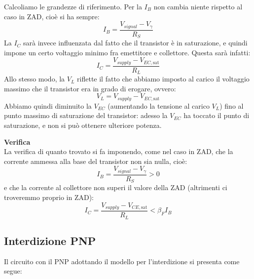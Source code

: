 \documentclass[a4paper,11pt]{article}
\begin{document}
Calcoliamo le grandezze di riferimento. Per la $I_B$ non cambia niente rispetto al caso in ZAD, cioè si ha sempre:
$$
I_B = \frac{V_{signal} - V_\gamma}{R_S}
$$
La $I_C$ sarà invece influenzata dal fatto che il transistor è in saturazione, e quindi impone un certo voltaggio minimo fra emettitore e collettore. Questa sarà infatti:
$$
I_C = \frac{V_{supply} - V_{EC,\mathrm{sat}}}{R_L}
$$
Allo stesso modo, la $V_L$ riflette il fatto che abbiamo imposto al carico il voltaggio massimo che il transistor era in grado di erogare, ovvero:
$$
V_L = V_{supply} - V_{EC,\mathrm{sat}}
$$
Abbiamo quindi diminuito la $V_{EC}$ (aumentando la tensione al carico $V_L$) fino al punto massimo di saturazione del transistor: adesso la $V_{EC}$ ha toccato il punto di saturazione, e non si può ottenere ulteriore potenza.

\par\smallskip
\noindent
\textbf{\textsf{Verifica}} \\
\noindent
La verifica di quanto trovato si fa imponendo, come nel caso in ZAD, che la corrente ammessa alla base del transistor non sia nulla, cioè:
$$
I_B = \frac{V_{signal} - V_\gamma}{R_S} > 0
$$
e che la corrente al collettore non superi il valore della ZAD (altrimenti ci troveremmo proprio in ZAD):
$$
I_C = \frac{V_{supply} - V_{CE,\mathrm{sat}}}{R_L} < \beta_F I_B
$$

\subsection{Interdizione PNP}
Il circuito con il PNP adottando il modello per l'interdizione si presenta come segue:
\end{document}

